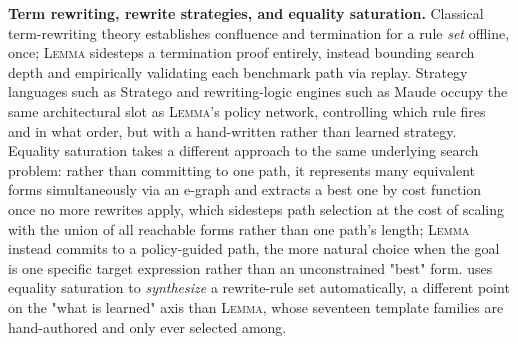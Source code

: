 \documentclass[11pt]{article}
\numberwithin{equation}{section}
\newcommand{\lemma}{\textsc{Lemma}}
\begin{document}
\textbf{Term rewriting, rewrite strategies, and equality saturation.} Classical term-rewriting theory \citep{knuthbendix1970,dershowitz1987termination,baadernipkow1998term,terese2003term} establishes confluence and termination for a rule \emph{set} offline, once; \lemma{} sidesteps a termination proof entirely, instead bounding search depth and empirically validating each benchmark path via replay. Strategy languages such as Stratego \citep{visser2001stratego} and rewriting-logic engines such as Maude \citep{clavel2002maude} occupy the same architectural slot as \lemma{}'s policy network, controlling which rule fires and in what order, but with a hand-written rather than learned strategy. Equality saturation \citep{tate2009equality,egg2021} takes a different approach to the same underlying search problem: rather than committing to one path, it represents many equivalent forms simultaneously via an e-graph and extracts a best one by cost function once no more rewrites apply, which sidesteps path selection at the cost of scaling with the union of all reachable forms rather than one path's length; \lemma{} instead commits to a policy-guided path, the more natural choice when the goal is one specific target expression rather than an unconstrained "best" form. \citet{nandi2021ruler} uses equality saturation to \emph{synthesize} a rewrite-rule set automatically, a different point on the "what is learned" axis than \lemma{}, whose seventeen template families are hand-authored and only ever selected among.
\end{document}
